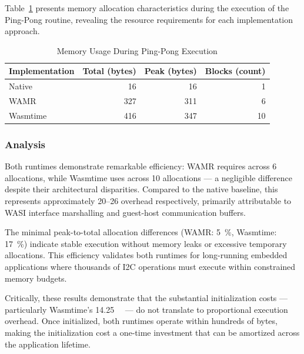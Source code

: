 Table~\ref{tab:memory-execution} presents memory allocation characteristics during the execution of the Ping-Pong routine, revealing the resource requirements for each implementation approach.

\begin{table}[H]
    \centering
    \caption{Memory Usage During Ping-Pong Execution}
    \label{tab:memory-execution}
    \begin{tabular}{lrrr}
        \toprule
        \textbf{Implementation} & \textbf{Total (bytes)} & \textbf{Peak (bytes)} & \textbf{Blocks (count)} \\
        \midrule
        Native        & 16   & 16  & 1 \\
        WAMR          & 327  & 311 & 6 \\
        Wasmtime      & 416  & 347 & 10 \\
        \bottomrule
    \end{tabular}
\end{table}

\subsubsection{Analysis}

Both runtimes demonstrate remarkable efficiency: WAMR requires  across 6 allocations, while Wasmtime uses  across 10 allocations --- a negligible  difference despite their architectural disparities. Compared to the  native baseline, this represents approximately \SIrange[round-precision=0]{20}{26}{\times} overhead respectively, primarily attributable to WASI interface marshalling and guest-host communication buffers.

The minimal peak-to-total allocation differences (WAMR: \SI[round-precision=0]{5}{\percent}, Wasmtime: \SI[round-precision=0]{17}{\percent}) indicate stable execution without memory leaks or excessive temporary allocations. This efficiency validates both runtimes for long-running embedded applications where thousands of I2C operations must execute within constrained memory budgets.

Critically, these results demonstrate that the substantial initialization costs --- particularly Wasmtime's \SI{14.25}{\mega\byte} --- do not translate to proportional execution overhead. Once initialized, both runtimes operate within hundreds of bytes, making the initialization cost a one-time investment that can be amortized across the application lifetime.

